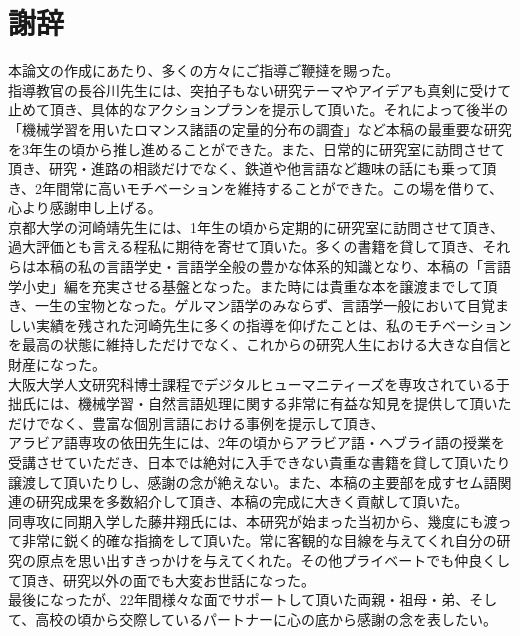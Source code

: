 \documentclass[12pt, oneside]{book}
\begin{document}
\chapter{謝辞}
本論文の作成にあたり、多くの方々にご指導ご鞭撻を賜った。
\\指導教官の長谷川先生には、突拍子もない研究テーマやアイデアも真剣に受けて止めて頂き、具体的なアクションプランを提示して頂いた。それによって後半の「機械学習を用いたロマンス諸語の定量的分布の調査」など本稿の最重要な研究を3年生の頃から推し進めることができた。また、日常的に研究室に訪問させて頂き、研究・進路の相談だけでなく、鉄道や他言語など趣味の話にも乗って頂き、2年間常に高いモチベーションを維持することができた。この場を借りて、心より感謝申し上げる。
\\京都大学の河崎靖先生には、1年生の頃から定期的に研究室に訪問させて頂き、過大評価とも言える程私に期待を寄せて頂いた。多くの書籍を貸して頂き、それらは本稿の私の言語学史・言語学全般の豊かな体系的知識となり、本稿の「言語学小史」編を充実させる基盤となった。また時には貴重な本を譲渡までして頂き、一生の宝物となった。ゲルマン語学のみならず、言語学一般において目覚ましい実績を残された河崎先生に多くの指導を仰げたことは、私のモチベーションを最高の状態に維持しただけでなく、これからの研究人生における大きな自信と財産になった。
\\大阪大学人文研究科博士課程でデジタルヒューマニティーズを専攻されている于拙氏には、機械学習・自然言語処理に関する非常に有益な知見を提供して頂いただけでなく、豊富な個別言語における事例を提示して頂き、
\\アラビア語専攻の依田先生には、2年の頃からアラビア語・ヘブライ語の授業を受講させていただき、日本では絶対に入手できない貴重な書籍を貸して頂いたり譲渡して頂いたりし、感謝の念が絶えない。また、本稿の主要部を成すセム語関連の研究成果を多数紹介して頂き、本稿の完成に大きく貢献して頂いた。
\\同専攻に同期入学した藤井翔氏には、本研究が始まった当初から、幾度にも渡って非常に鋭く的確な指摘をして頂いた。常に客観的な目線を与えてくれ自分の研究の原点を思い出すきっかけを与えてくれた。その他プライベートでも仲良くして頂き、研究以外の面でも大変お世話になった。
\\最後になったが、22年間様々な面でサポートして頂いた両親・祖母・弟、そして、高校の頃から交際しているパートナーに心の底から感謝の念を表したい。
\backmatter

 
\end{document}
